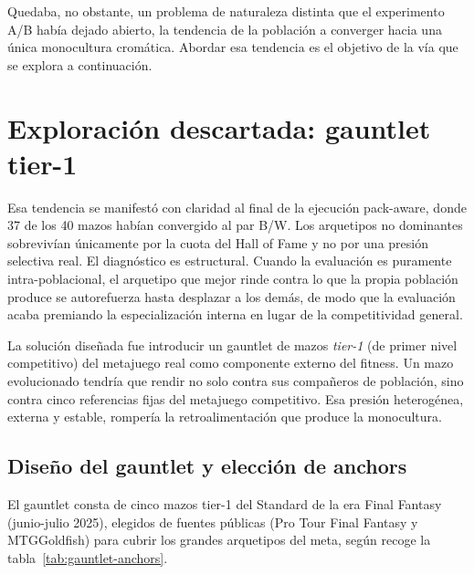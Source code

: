 Quedaba, no obstante, un problema de naturaleza distinta que el experimento A/B había dejado abierto, la tendencia de la población a converger hacia una única monocultura cromática. Abordar esa tendencia es el objetivo de la vía que se explora a continuación.

\section{Exploración descartada: gauntlet tier-1}
\label{sec:gauntlet}

Esa tendencia se manifestó con claridad al final de la ejecución pack-aware, donde 37 de los 40 mazos habían convergido al par B/W. Los arquetipos no dominantes sobrevivían únicamente por la cuota del Hall of Fame y no por una presión selectiva real. El diagnóstico es estructural. Cuando la evaluación es puramente intra-poblacional, el arquetipo que mejor rinde contra lo que la propia población produce se autorefuerza hasta desplazar a los demás, de modo que la evaluación acaba premiando la especialización interna en lugar de la competitividad general.

La solución diseñada fue introducir un gauntlet de mazos \emph{tier-1} (de primer nivel competitivo) del metajuego real como componente externo del fitness. Un mazo evolucionado tendría que rendir no solo contra sus compañeros de población, sino contra cinco referencias fijas del metajuego competitivo. Esa presión heterogénea, externa y estable, rompería la retroalimentación que produce la monocultura.

\subsection{Diseño del gauntlet y elección de anchors}

El gauntlet consta de cinco mazos tier-1 del Standard de la era Final Fantasy (junio-julio 2025), elegidos de fuentes públicas (Pro Tour Final Fantasy y MTGGoldfish) para cubrir los grandes arquetipos del meta, según recoge la tabla~\ref{tab:gauntlet-anchors}.

